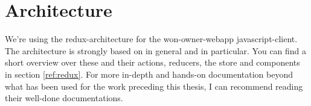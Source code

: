 \section{Architecture}\label{architecture}

We're using the redux-architecture for the won-owner-webapp javascript-client.
The architecture is strongly based on
 in general and
 in particular. You can
find a short overview over these and their actions, reducers, the store and components
in section \ref{ref:redux}. For more in-depth
and hands-on documentation beyond what has been used for the work preceding
this thesis, I can recommend reading their well-done documentations.

